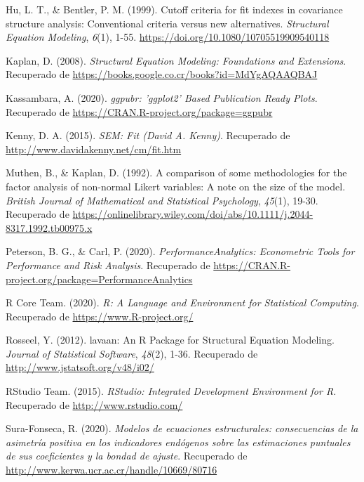 \documentclass[
]{article}
\newlength{\cslhangindent}
\newenvironment{cslreferences}%
  {\setlength{\parindent}{0pt}%
  \everypar{\setlength{\hangindent}{\cslhangindent}}\ignorespaces}%
  {\par}
\begin{document}
\begin{cslreferences}
\leavevmode\hypertarget{ref-Hu1999}{}%
Hu, L. T., \& Bentler, P. M. (1999). Cutoff criteria for fit indexes in
covariance structure analysis: Conventional criteria versus new
alternatives. \emph{Structural Equation Modeling}, \emph{6}(1), 1-55.
\url{https://doi.org/10.1080/10705519909540118}

\leavevmode\hypertarget{ref-kaplan}{}%
Kaplan, D. (2008). \emph{Structural Equation Modeling: Foundations and
Extensions}. Recuperado de
\url{https://books.google.co.cr/books?id=MdYgAQAAQBAJ}

\leavevmode\hypertarget{ref-ggpubr}{}%
Kassambara, A. (2020). \emph{ggpubr: 'ggplot2' Based Publication Ready
Plots}. Recuperado de \url{https://CRAN.R-project.org/package=ggpubr}

\leavevmode\hypertarget{ref-Kenny2015}{}%
Kenny, D. A. (2015). \emph{SEM: Fit (David A. Kenny)}. Recuperado de
\url{http://www.davidakenny.net/cm/fit.htm}

\leavevmode\hypertarget{ref-muthen}{}%
Muthen, B., \& Kaplan, D. (1992). A comparison of some methodologies for
the factor analysis of non-normal Likert variables: A note on the size
of the model. \emph{British Journal of Mathematical and Statistical
Psychology}, \emph{45}(1), 19-30. Recuperado de
\url{https://onlinelibrary.wiley.com/doi/abs/10.1111/j.2044-8317.1992.tb00975.x}

\leavevmode\hypertarget{ref-PerformanceAnalytics}{}%
Peterson, B. G., \& Carl, P. (2020). \emph{PerformanceAnalytics:
Econometric Tools for Performance and Risk Analysis}. Recuperado de
\url{https://CRAN.R-project.org/package=PerformanceAnalytics}

\leavevmode\hypertarget{ref-R}{}%
R Core Team. (2020). \emph{R: A Language and Environment for Statistical
Computing}. Recuperado de \url{https://www.R-project.org/}

\leavevmode\hypertarget{ref-lavaan}{}%
Rosseel, Y. (2012). lavaan: An R Package for Structural Equation
Modeling. \emph{Journal of Statistical Software}, \emph{48}(2), 1-36.
Recuperado de \url{http://www.jstatsoft.org/v48/i02/}

\leavevmode\hypertarget{ref-RStudio}{}%
RStudio Team. (2015). \emph{RStudio: Integrated Development Environment
for R}. Recuperado de \url{http://www.rstudio.com/}

\leavevmode\hypertarget{ref-sura}{}%
Sura-Fonseca, R. (2020). \emph{Modelos de ecuaciones estructurales:
consecuencias de la asimetría positiva en los indicadores endógenos
sobre las estimaciones puntuales de sus coeficientes y la bondad de
ajuste}. Recuperado de
\url{http://www.kerwa.ucr.ac.cr/handle/10669/80716}


\end{cslreferences}
\end{document}
